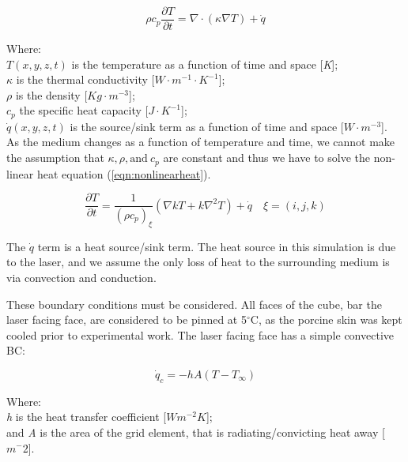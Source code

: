 \begin{equation}
\rho c_p \frac{\partial T}{\partial t}= \nabla \cdot (\kappa \nabla T) + \dot{q}
\label{eqn:heat}
\end{equation}

\noindent Where:\\
	\indent $T(x, y, z, t)$ is the temperature as a function of time and space [\textit{K}];\\
	\indent $\kappa$ is the thermal conductivity [$W\cdot m^{-1}\cdot K^{-1}$];\\ 
	\indent $\rho$ is the density [$Kg \cdot m^{-3}$];\\
	\indent $c_p$ the specific heat capacity [$J\cdot K^{-1}$];\\
	\indent $\dot{q}(x,y,z,t)$ is the source/sink term as a function of time and space [$W\cdot m^{-3}$].\\

As the medium changes as a function of temperature and time, we cannot make the assumption that $\kappa, \rho, \text{and}\  c_p$ are constant and thus we have to solve the non-linear heat equation (\cref{eqn:nonlinearheat}).

\begin{equation}
\frac{\partial T}{\partial t} = \frac{1}{(\rho c_p)_{\xi}}(\nabla kT + k\nabla^2T)+\dot{q}\quad \xi=(i,j,k)
\label{eqn:nonlinearheat}
\end{equation}

The $\dot{q}$ term is a heat source/sink term. The heat source in this simulation is due to the laser, and we assume the only loss of heat to the surrounding medium is via convection and conduction.
	
These boundary conditions must be considered. All faces of the cube, bar the laser facing face, are considered to be pinned at 5$^{\circ}$C, as the porcine skin was kept cooled prior to experimental work. The laser facing face has a simple convective BC:	

\begin{equation}
\dot{q}_c = -hA(T - T_\infty)
\label{eqn:bceqns}
\end{equation}

\noindent Where:\\
	\indent \textit{h} is the heat transfer coefficient [$W m^{-2} K$];\\
	\indent and \textit{A} is the area of the grid element, that is radiating/convicting heat away [$m^-{2}$].\\

